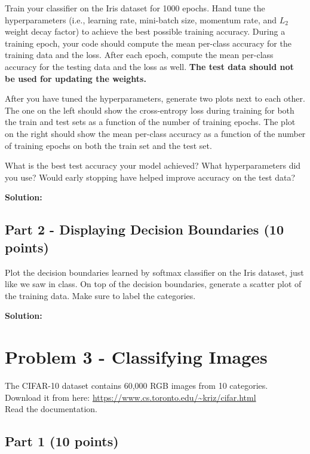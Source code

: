 \documentclass[11pt, oneside]{article}   	%
\begin{document}
Train your classifier on the Iris dataset for 1000 epochs. Hand tune the hyperparameters (i.e., learning rate, mini-batch size, momentum rate, and $L_2$ weight decay factor) to achieve the best possible training accuracy. During a training epoch, your code should compute the mean per-class accuracy for the training data and the loss. After each epoch, compute the mean per-class accuracy for the testing data and the loss as well. \textbf{The test data should not be used for updating the weights.}

After you have tuned the hyperparameters, generate two plots next to each other. The one on the left should show the cross-entropy loss during training for both the train and test sets as a function of the number of training epochs. The plot on the right should show the mean per-class accuracy as a function of the number of training epochs on both the train set and the test set. 

What is the best test accuracy your model achieved? What hyperparameters did you use? Would early stopping have helped improve accuracy on the test data?

\textbf{Solution:} \\



\subsection*{Part 2 - Displaying Decision Boundaries (10 points)}

Plot the decision boundaries learned by softmax classifier on the Iris dataset, just like we saw in class. On top of the decision boundaries, generate a scatter plot of the training data. Make sure to label the categories.

\textbf{Solution:} \\


\section*{Problem 3 - Classifying Images}

The CIFAR-10 dataset contains 60,000 RGB images from 10 categories. Download it from here: \url{https://www.cs.toronto.edu/~kriz/cifar.html}\\
Read the documentation.


\subsection*{Part 1 (10 points)}
\end{document}
